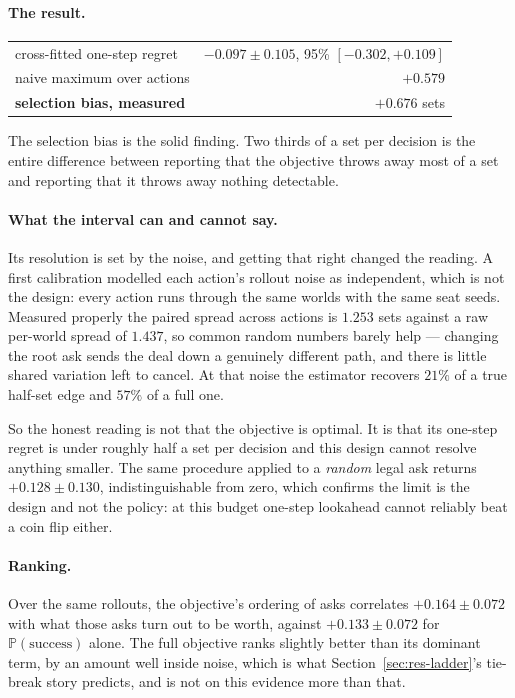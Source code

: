\documentclass[11pt,letterpaper]{article}
\newcommand{\Prob}{\ensuremath{\mathbb{P}}}
\begin{document}
\paragraph{The result.}

\begin{center}
\small
\begin{tabular}{lr}
\toprule
cross-fitted one-step regret & $-0.097 \pm 0.105$, 95\% $[-0.302, +0.109]$ \\
naive maximum over actions   & $+0.579$ \\
\textbf{selection bias, measured} & $\mathbf{+0.676}$ sets \\
\bottomrule
\end{tabular}
\end{center}

The selection bias is the solid finding. Two thirds of a set per decision is the
entire difference between reporting that the objective throws away most of a set
and reporting that it throws away nothing detectable.

\paragraph{What the interval can and cannot say.} Its resolution is set by the
noise, and getting that right changed the reading. A first calibration modelled
each action's rollout noise as independent, which is not the design: every
action runs through the same worlds with the same seat seeds. Measured properly
the paired spread across actions is $1.253$ sets against a raw per-world spread
of $1.437$, so common random numbers barely help --- changing the root ask sends
the deal down a genuinely different path, and there is little shared variation
left to cancel. At that noise the estimator recovers $21\%$ of a true half-set
edge and $57\%$ of a full one.

So the honest reading is not that the objective is optimal. It is that its
one-step regret is under roughly half a set per decision and this design cannot
resolve anything smaller. The same procedure applied to a \emph{random} legal ask
returns $+0.128 \pm 0.130$, indistinguishable from zero, which confirms the limit
is the design and not the policy: at this budget one-step lookahead cannot
reliably beat a coin flip either.

\paragraph{Ranking.} Over the same rollouts, the objective's ordering of asks
correlates $+0.164 \pm 0.072$ with what those asks turn out to be worth, against
$+0.133 \pm 0.072$ for $\Prob(\text{success})$ alone. The full objective ranks
slightly better than its dominant term, by an amount well inside noise, which
is what Section~\ref{sec:res-ladder}'s tie-break story predicts, and is not on
this evidence more than that.
\end{document}
